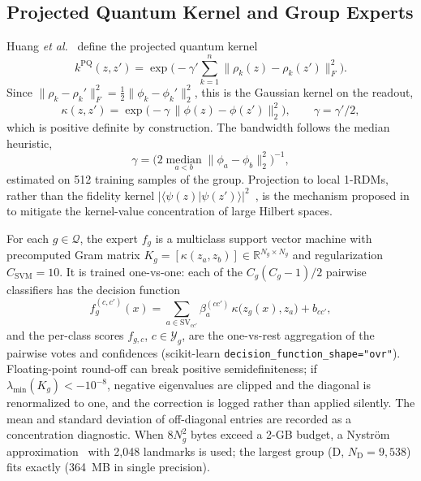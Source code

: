 \documentclass[conference]{IEEEtran}
\begin{document}
\begin{figure}[!t]
    \label{fig:viz-encoding}
\end{figure}

\subsection{Projected Quantum Kernel and Group Experts}
\label{sec:kernel}

Huang \textit{et al.}~\cite{huang2021power} define the projected quantum kernel
\begin{equation}
    k^{\mathrm{PQ}}(z,z')=\exp\!\Big(-\gamma'\sum_{k=1}^{n}\big\|\rho_k(z)-\rho_k(z')\big\|_F^2\Big).
\end{equation}
Since $\|\rho_k-\rho_k'\|_F^2=\tfrac12\|\phi_k-\phi_k'\|_2^2$, this is the Gaussian kernel on the readout,
\begin{equation}
    \kappa(z,z')=\exp\!\big(-\gamma\,\|\phi(z)-\phi(z')\|_2^2\big),\qquad\gamma=\gamma'/2,
    \label{eq:pqk}
\end{equation}
which is positive definite by construction. The bandwidth follows the median heuristic,
\begin{equation}
    \gamma=\Big(2\operatorname*{median}_{a<b}\|\phi_a-\phi_b\|_2^2\Big)^{-1},
    \label{eq:median-gamma}
\end{equation}
estimated on 512 training samples of the group. Projection to local 1-RDMs, rather than the fidelity kernel $|\langle\psi(z)|\psi(z')\rangle|^2$~\cite{havlicek2019}, is the mechanism proposed in~\cite{huang2021power} to mitigate the kernel-value concentration of large Hilbert spaces.

For each $g\in\mathcal{Q}$, the expert $f_g$ is a multiclass support vector machine with precomputed Gram matrix $K_g=[\kappa(z_a,z_b)]\in\mathbb{R}^{N_g\times N_g}$ and regularization $C_{\mathrm{SVM}}=10$. It is trained one-vs-one: each of the $C_g(C_g-1)/2$ pairwise classifiers has the decision function
\begin{equation}
    f^{(c,c')}_g(x)=\sum_{a\in\mathrm{SV}_{cc'}}\beta^{(cc')}_{a}\,\kappa\big(z_g(x),z_a\big)+b_{cc'},
    \label{eq:svm}
\end{equation}
and the per-class scores $f_{g,c}$, $c\in\mathcal{Y}_g$, are the one-vs-rest aggregation of the pairwise votes and confidences (scikit-learn \texttt{decision\_function\_shape="ovr"}). Floating-point round-off can break positive semidefiniteness; if $\lambda_{\min}(K_g)<-10^{-8}$, negative eigenvalues are clipped and the diagonal is renormalized to one, and the correction is logged rather than applied silently. The mean and standard deviation of off-diagonal entries are recorded as a concentration diagnostic. When $8N_g^2$ bytes exceed a 2-GB budget, a Nystr\"om approximation~\cite{williams2001nystrom} with 2,048 landmarks is used; the largest group (D, $N_{\mathrm{D}}=9{,}538$) fits exactly (364~MB in single precision).
\end{document}
